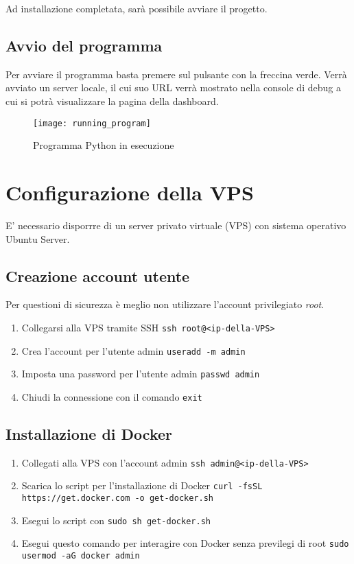 Ad installazione completata, sarà possibile avviare il progetto.

\subsection{Avvio del programma}

Per avviare il programma basta premere sul pulsante con la freccina verde.
Verrà avviato un server locale, il cui suo URL verrà mostrato nella console di debug a cui si potrà visualizzare la pagina della dashboard.

 \begin{figure}[htp]
    \centering
    \texttt{[image: running\_program]}
    \caption{Programma Python in esecuzione}
    \label{fig:running_program}
\end{figure}

\section{Configurazione della VPS}
E' necessario disporrre di un server privato virtuale (VPS) con sistema operativo Ubuntu Server.

\subsection{Creazione account utente}
Per questioni di sicurezza è meglio non utilizzare l'account privilegiato \emph{root}.
\begin{enumerate}
\item Collegarsi alla VPS tramite SSH \texttt{ssh root@<ip-della-VPS>}
\item Crea l'account per l'utente admin \texttt{useradd -m admin}
\item Imposta una password per l'utente admin \texttt{passwd admin}
\item Chiudi la connessione con il comando \texttt{exit}
\end{enumerate}

\subsection{Installazione di Docker}

\begin{enumerate}
\item Collegati alla VPS con l'account admin \texttt{ssh admin@<ip-della-VPS>}
\item Scarica lo script per l'installazione di Docker \texttt{curl -fsSL https://get.docker.com -o get-docker.sh}
\item Esegui lo script con \texttt{sudo sh get-docker.sh}
\item Esegui questo comando per interagire con Docker senza previlegi di root \texttt{sudo usermod -aG docker admin}
\end{enumerate}

